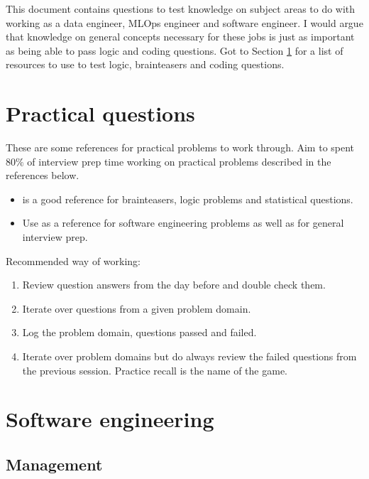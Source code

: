This document contains questions to test knowledge on subject areas to do with working as a data engineer, MLOps engineer and software engineer. I would argue that knowledge on general concepts necessary for these jobs is just as important as being able to pass logic and coding questions. Got to Section \ref{sec:practical_problems} for a list of resources to use to test logic, brainteasers and coding questions.

\tableofcontents

\section{Practical questions} \label{sec:practical_problems}

These are some references for practical problems to work through. Aim to spent $80\%$ of interview prep time working on practical problems described in the references below.
\begin{itemize}
    \item \cite{hots} is a good reference for brainteasers, logic problems and statistical questions.
    \item Use \cite{ctci} as a reference for software engineering problems as well as for general interview prep.
\end{itemize}

Recommended way of working:
\begin{enumerate}
    \item Review question answers from the day before and double check them.
    \item Iterate over questions from a given problem domain.
    \item Log the problem domain, questions passed and failed.
    \item Iterate over problem domains but do always review the failed questions from the previous session. Practice recall is the name of the game.
\end{enumerate}

\section{Software engineering}

\subsection{Management}

